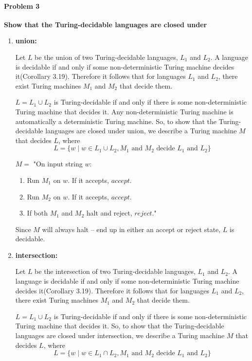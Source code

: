\documentclass{article}
\begin{document}
\paragraph{Problem 3}
\textbf{Show that the Turing-decidable languages are closed under}
\begin{enumerate}[\indent a)]
    \item \textbf{union:} 
    
    Let $L$ be the union of two Turing-decidable languages, $L_1$ and $L_2$. A language is decidable if and only if some non-deterministic Turing machine decides it(Corollary 3.19). Therefore it follows that for languages $L_1$ and $L_2$, there exist Turing machines $M_1$ and $M_2$ that decide them.

$L = L_1 \cup L_2$ is Turing-decidable if and only if there is some non-deterministic Turing machine that decides it. Any non-deterministic Turing machine is automatically a deterministic Turing machine. So, to show that the Turing-decidable languages are closed under union, we describe a Turing machine $M$ that decides $L$, where
$$L = \{w \;|\;  w \in L_1\cup L_2, M_1 \text{ and  $M_2$ decide $L_1$ and $L_2$}\}$$

$M = $ "On input string $w$: 
    \begin{enumerate}[\indent 1.]
    \item Run $M_1$ on $w$. If it accepts, $accept$.
    \item Run $M_2$ on $w$. If it accepts, $accept$.
    \item If both $M_1$ and $M_2$ halt and reject, $reject$."
    \end{enumerate}
    
    
    Since $M$ will always halt -- end up in either an accept or reject state, $L$ is decidable.
    
    \item \textbf{intersection:} 
    
    Let $L$ be the intersection of two Turing-decidable languages, $L_1$ and $L_2$. A language is decidable if and only if some non-deterministic Turing machine decides it(Corollary 3.19). Therefore it follows that for languages $L_1$ and $L_2$, there exist Turing machines $M_1$ and $M_2$ that decide them.

$L = L_1 \cup L_2$ is Turing-decidable if and only if there is some non-deterministic Turing machine that decides it. So, to show that the Turing-decidable languages are closed under intersection, we describe a Turing machine $M$ that decides $L$, where
$$L = \{w \;|\;  w \in L_1\cap L_2, M_1 \text{ and  $M_2$ decide $L_1$ and $L_2$}\}$$


\end{enumerate}
\end{document}
